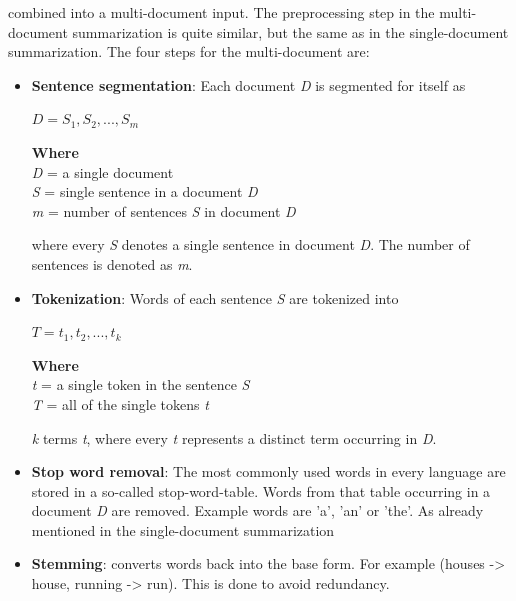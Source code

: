 combined into a multi-document input.
The preprocessing step in the multi-document summarization is quite similar, but the same as in the single-document summarization. The four steps for the multi-document are:
 
 
\begin{itemize}
	\item \textbf{Sentence segmentation}: Each document \textit{D} is segmented for itself as 
	\begin{tcolorbox}
		\begin{center}
		\(D = {S_{1}, S_{2},..., S_{m}}\)
		\end{center}
	\end{tcolorbox}
	\begin{tcolorbox}
		\textbf{Where}\\
		\textit{D} = a single document \\
		\textit{S} = single sentence in a document \textit{D}\\
		\textit{m} = number of sentences \textit{S} in document \textit{D}
	\end{tcolorbox}
	where every \textit{S} denotes a single sentence in document \textit{D}. The number of sentences is denoted as \textit{m}.
	\item \textbf{Tokenization}: Words of each sentence \textit{S} are tokenized into 
	\begin{tcolorbox}
		\begin{center}
			\(T = {t_{1}, t_{2},..., t_{k}}\) 
		\end{center}
	\end{tcolorbox}
	\begin{tcolorbox}
		\textbf{Where} \\
		\textit{t} = a single token in the sentence \textit{S} \\
		\textit{T} = all of the single tokens \textit{t}
	\end{tcolorbox}
	
	\textit{k} terms \textit{t}, where every \textit{t} represents a distinct term occurring in \textit{D}. 
	\item \textbf{Stop word removal}: The most commonly used words in every language are stored in a so-called stop-word-table. Words from that table occurring in a document \textit{D} are removed. Example words are 'a', 'an' or 'the'. As already mentioned in the single-document summarization
	\item \textbf{Stemming}: converts words back into the base form. For example (houses -> house, running -> run). This is done to avoid redundancy.
\end{itemize}
 
